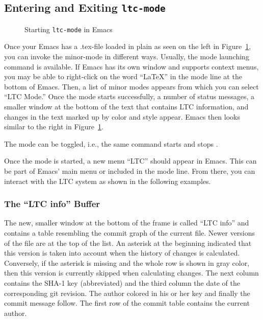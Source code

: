 \subsection{Entering and Exiting \texttt{ltc-mode}}

\begin{figure}[t]
\centering
{}
\hspace{2ex}
\hspace{2ex}
\caption{Starting \texttt{ltc-mode} in Emacs} \label{fig:emacs-ltc-started}
\end{figure}

Once your Emacs has a .tex-file loaded in plain  as seen on the left in Figure~\ref{fig:emacs-ltc-started}, you can invoke the minor-mode  in different ways.  Usually, the mode launching command  is available.  If Emacs has its own window and supports context menus, you may be able to right-click on the word ``LaTeX'' in the mode line at the bottom of Emacs. Then, a list of minor modes appears from which you can select ``LTC Mode.''  Once the mode starts successfully, a number of status messages, a smaller window at the bottom of the text that contains LTC information, and changes in the text marked up by color and style appear.  Emacs then looks similar to the right in Figure~\ref{fig:emacs-ltc-started}.

The mode can be toggled, i.e., the same command starts and stops .

Once the mode is started, a new menu ``LTC'' should appear in Emacs.  This can be part of Emacs' main menu or included in the mode line.  From there, you can interact with the LTC system as shown in the following examples.

\subsubsection{The ``LTC info'' Buffer}

The new, smaller window at the bottom of the frame is called ``LTC info'' and contains a table resembling the commit graph of the current file.  Newer versions of the file are at the top of the list.  An asterisk at the beginning  indicated that this version is taken into account when the history of changes is calculated.  Conversely, if the asterisk is missing and the whole row is shown in gray color, then this version is currently skipped when calculating changes.  The next column contains the SHA-1 key (abbreviated) and the third column the date  of the corresponding git revision.  The author colored in his or her key and finally the commit message follow.  The first row of the commit table contains the current author.

